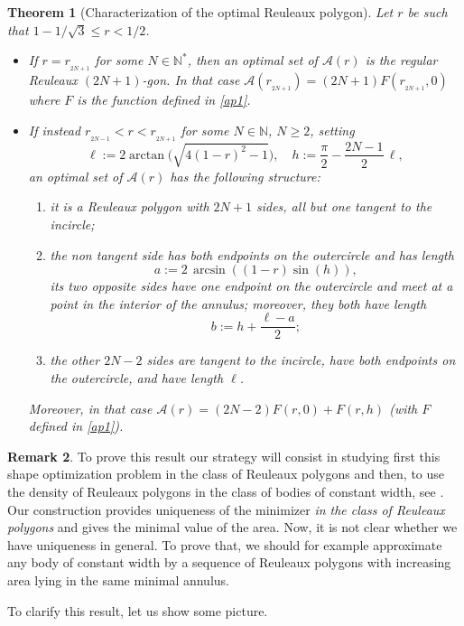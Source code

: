 \documentclass[JEP,XML,SOM,Unicode,NoFloatCountersInSection]{cedram}
\let\mathcal\mathscr
\theoremstyle{plain}
\newtheorem{theorem}{Theorem}[section]
\theoremstyle{definition}
\newtheorem{remark}[theorem]{Remark}
\newcommand\A{\mathcal A}
\renewcommand\r{r_{_{2N+1}}}
\begin{document}
\skpt
\begin{theorem}[Characterization of the optimal Reuleaux polygon]\label{thm}
Let $r$ be such that $1-1/\sqrt{3}\leq r < 1/2$. 

\begin{itemize}
\item
If $r=\r$ for some $N\in \mathbb N^*$, then {an} optimal set of $\A(r)$ is the regular Reuleaux $(2N+1)$-gon. In that case $\A(\r)=(2N+1)F(\r,0)$ where $F$ is the function defined in \eqref{ap1}.

\item
If instead $r_{_{2N-1}}<r<r_{_{2N+1}}$ for some $N\in \mathbb N$, $N\geq 2$,
setting
\[
\ell:=2 \arctan\bigl(\sqrt{4(1-r)^2-1}\bigr),\quad h:=\frac\pi2 - \frac{2N-1}{2}\, \ell,
\]
an optimal set of $\A(r)$ has the following structure:
\begin{enumerate}
\item
it is a Reuleaux polygon with $2N+1$ sides, all but one tangent to the incircle;
\item
the non tangent side has both endpoints on the outercircle and has length
\[
a:=2\,\arcsin\left((1-r)\sin(h)\right),
\]
its two opposite sides have one endpoint on the outercircle and meet at a point in the interior of the annulus; moreover, they both have length
\[
b:= h + \frac{\ell -a}{2};
\]
\item
the other $2N-2$ sides are tangent to the incircle, have both endpoints on the outercircle, and have length $\ell$.
\end{enumerate}
Moreover, in that case $\A(r)=(2N-2)F(r,0)+F(r,h)$ (with $F$ defined in \eqref{ap1}).
\end{itemize}
\end{theorem}

\begin{remark}
To prove this result our strategy will consist in studying first this shape optimization problem
in the class of Reuleaux polygons and then, to use the density of Reuleaux polygons in the class of bodies of constant width, see \eg \cite{BF}.
Our construction provides uniqueness of the minimizer \emph{in the class of Reuleaux polygons}
and gives the minimal value of the area.
Now, it is not clear whether we have uniqueness in general. To prove that, we should
for example approximate any body of constant width by a sequence of Reuleaux polygons with increasing area lying in the same minimal annulus.
\end{remark}
To clarify this result, let us show some picture.
\end{document}

